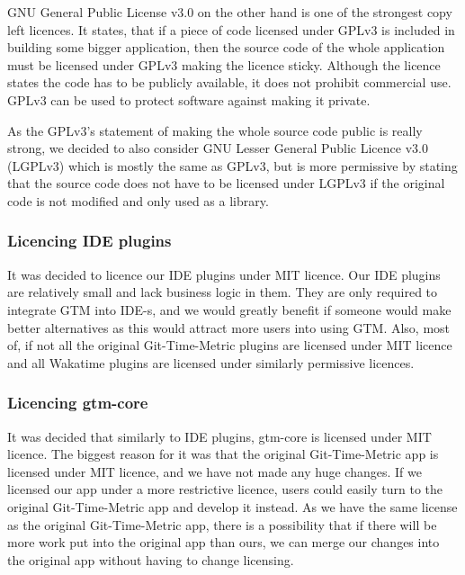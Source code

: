 GNU General Public License v3.0 on the other hand is one of the strongest copy left licences.
It states, that if a piece of code licensed under GPLv3 is included in building some bigger application,
then the source code of the whole application must be licensed under GPLv3 making the licence sticky.
Although the licence states the code has to be publicly available, it does not prohibit commercial use.
GPLv3 can be used to protect software against making it private.
\cite{gplv3-licence}

As the GPLv3's statement of making the whole source code public is really strong, we decided to also consider
GNU Lesser General Public Licence v3.0 (LGPLv3) which is mostly the same as GPLv3, but is more permissive by
stating that the source code does not have to be licensed under LGPLv3 if the original code is not modified and only used as a library.
\cite{lgplv3-licence}

\subsubsection{Licencing IDE plugins}\label{subsubsec:licencing-ide-plugins}
It was decided to licence our IDE plugins under MIT licence.
Our IDE plugins are relatively small and lack business logic in them.
They are only required to integrate GTM into IDE-s, and we would greatly benefit if someone would make better alternatives
as this would attract more users into using GTM.
Also, most of, if not all the original Git-Time-Metric plugins are licensed under MIT licence and all Wakatime plugins are
licensed under similarly permissive licences.

\subsubsection{Licencing gtm-core}\label{subsubsec:licencing-gtm-core}
It was decided that similarly to IDE plugins, gtm-core is licensed under MIT licence.
The biggest reason for it was that the original Git-Time-Metric app is licensed under MIT licence, and we have not made any huge changes.
If we licensed our app under a more restrictive licence, users could easily turn to the original Git-Time-Metric app and develop it instead.
As we have the same license as the original Git-Time-Metric app, there is a possibility that if there will be more work put into the
original app than ours, we can merge our changes into the original app without having to change licensing.

